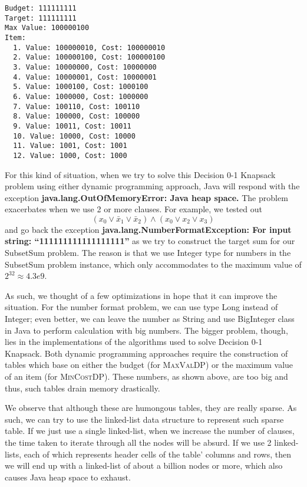\documentclass[12pt, oneside]{book}
\begin{document}
\begin{verbatim}
Budget: 111111111
Target: 111111111
Max Value: 100000100
Item:
  1. Value: 100000010, Cost: 100000010
  2. Value: 100000100, Cost: 100000100
  3. Value: 10000000, Cost: 10000000
  4. Value: 10000001, Cost: 10000001
  5. Value: 1000100, Cost: 1000100
  6. Value: 1000000, Cost: 1000000
  7. Value: 100110, Cost: 100110
  8. Value: 100000, Cost: 100000
  9. Value: 10011, Cost: 10011
  10. Value: 10000, Cost: 10000
  11. Value: 1001, Cost: 1001
  12. Value: 1000, Cost: 1000
\end{verbatim}

For this kind of situation, when we try to solve this Decision 0-1
Knapsack problem using either dynamic programming approach, Java will
respond with the exception \textbf{java.lang.OutOfMemoryError: Java heap
space.} The problem exacerbates when we use 2 or more clauses. For
example, we tested out
\[(x_{0} \lor \bar{x}_{1} \lor \bar{x}_{2}) \land (x_{0} \lor x_{2} \lor x_{3})\]
and go back the exception \textbf{java.lang.NumberFormatException: For
input string: ``111111111111111111''} as we try to construct the target
sum for our SubsetSum problem. The reason is that we use Integer type
for numbers in the SubsetSum problem instance, which only accommodates
to the maximum value of \(2^{32} \approx 4.3e9\).

As such, we thought of a few optimizations in hope that it can improve
the situation. For the number format problem, we can use type Long
instead of Integer; even better, we can leave the number as String and
use BigInteger class in Java to perform calculation with big numbers.
The bigger problem, though, lies in the implementations of the
algorithms used to solve Decision 0-1 Knapsack. Both dynamic programming
approaches require the construction of tables which base on either the
budget (for \textsc{MaxValDP}) or the maximum value of an item (for
\textsc{MinCostDP}). These numbers, as shown above, are too big and
thus, such tables drain memory drastically.

We observe that although these are humongous tables, they are really
sparse. As such, we can try to use the linked-list data structure to
represent such sparse table. If we just use a single linked-list, when
we increase the number of clauses, the time taken to iterate through all
the nodes will be absurd. If we use 2 linked-lists, each of which
represents header cells of the table' columns and rows, then we will end
up with a linked-list of about a billion nodes or more, which also
causes Java heap space to exhaust.
\end{document}
